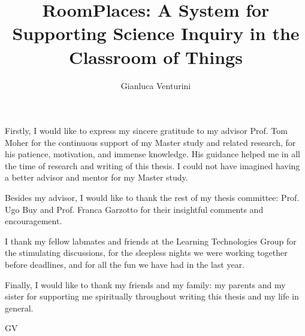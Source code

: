 \documentclass{uicthesi}
\begin{document}

\title{RoomPlaces: A System for Supporting Science Inquiry in the Classroom of Things}
\author{Gianluca Venturini}
\maketitle


\acknowledgements
{Firstly, I would like to express my sincere gratitude to my advisor Prof. Tom Moher for the continuous support of my Master study and related research, for his patience, motivation, and immense knowledge. His guidance helped me in all the time of research and writing of this thesis. I could not have imagined having a better advisor and mentor for my Master study.

Besides my advisor, I would like to thank the rest of my thesis committee: Prof. Ugo Buy and Prof. Franca Garzotto for their insightful comments and encouragement.

I thank my fellow labmates and friends at the Learning Technologies Group for the stimulating discussions, for the sleepless nights we were working together before deadlines, and for all the fun we have had in the last year.

Finally, I would like to thank my friends and my family: my parents and my sister for supporting me spiritually throughout writing this thesis and my life in general.

\begin{flushright}
GV %
\end{flushright}}
\end{document}
